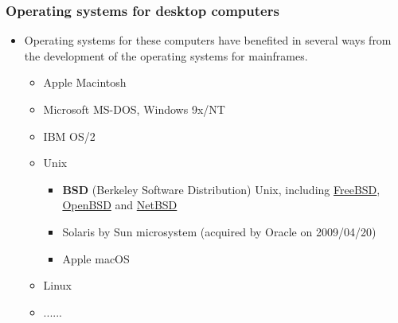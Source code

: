 \documentclass[CJKutf8,dvipsnames,table]{beamer}
\begin{document}
\begin{CJK*}{UTF8}{song}
  \begin{frame}
  \frametitle{Operating systems for desktop computers} \pause
	  \begin{itemize}
	  	\item Operating systems for these computers have benefited in several ways from the development of the operating systems for mainframes.  \pause
	    \begin{itemize}
		    \item Apple Macintosh  \pause
		    \item Microsoft MS-DOS, Windows 9x/NT  \pause
		    \item IBM OS/2  \pause
		    \item Unix  \pause
		      \begin{itemize}
		      \item \textbf{BSD} (Berkeley Software Distribution) Unix, including \href{https://www.freebsd.org/}{FreeBSD}, \href{https://www.openbsd.org/}{OpenBSD} and \href{https://www.netbsd.org/}{NetBSD}  \pause
		      \item Solaris by Sun microsystem (acquired by Oracle on 2009/04/20)  \pause
		      \item Apple macOS  \pause
		      \end{itemize}
			\item Linux  \pause
		    \item ...... 
	    \end{itemize}
	  \end{itemize}
  \end{frame}


\end{CJK*}
\end{document}

